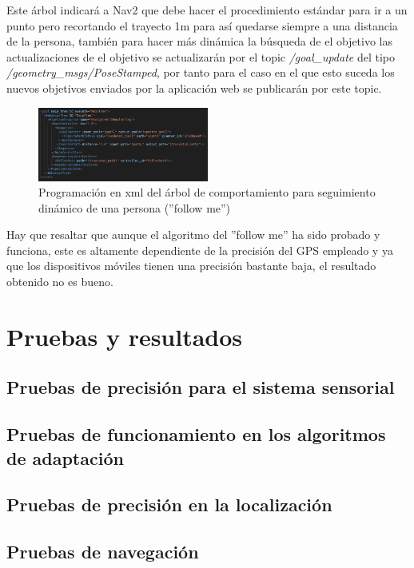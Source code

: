 Este árbol indicará a Nav2 que debe hacer el procedimiento estándar para ir a un punto pero recortando el trayecto 1m para así quedarse siempre a una distancia de la persona, también para hacer más dinámica 
la búsqueda de el objetivo las actualizaciones de el objetivo se actualizarán por el topic \textit{/goal\_update} del tipo \textit{/geometry\_msgs/PoseStamped}, por tanto 
para el caso en el que esto suceda los nuevos objetivos enviados por la aplicación web se publicarán por este topic.

\begin{figure}[H]
    \centering
    \includegraphics[width=0.5\textwidth]{images/dynamic_object_bt.png}
    \caption{Programación en xml del árbol de comportamiento para seguimiento dinámico de una persona (''follow me'')}
    \label{fig:follow_me}
\end{figure}

Hay que resaltar que aunque el algoritmo del ''follow me'' ha sido probado y funciona, este es altamente dependiente de la precisión del GPS 
empleado y ya que los dispositivos móviles tienen una precisión bastante baja, el resultado obtenido no es bueno.
\cleardoublepage
\chapter{Pruebas y resultados}

\section{Pruebas de precisión para el sistema sensorial}

\section{Pruebas de funcionamiento en los algoritmos de adaptación}

\section{Pruebas de precisión en la localización}

\section{Pruebas de navegación}

